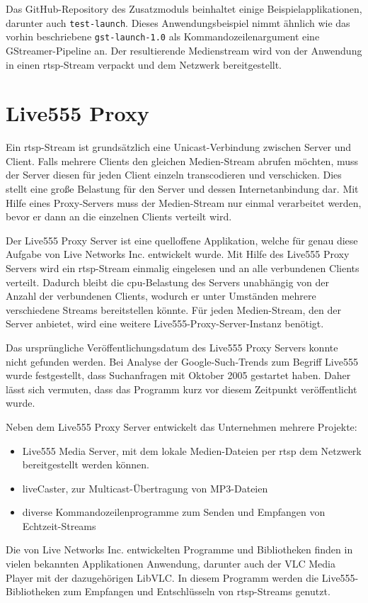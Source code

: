 Das GitHub-Repository des Zusatzmoduls beinhaltet einige Beispielapplikationen, darunter auch \texttt{test-launch}.
Dieses Anwendungsbeispiel nimmt ähnlich wie das vorhin beschriebene \texttt{gst-launch-1.0} als Kommandozeilenargument eine GStreamer-Pipeline an.
Der resultierende Medienstream wird von der Anwendung in einen \ac{rtsp}-Stream verpackt und dem Netzwerk bereitgestellt.

\section{Live555 Proxy}
Ein \ac{rtsp}-Stream ist grundsätzlich eine Unicast-Verbindung zwischen Server und Client.
Falls mehrere Clients den gleichen Medien-Stream abrufen möchten, muss der Server diesen für jeden Client einzeln transcodieren und verschicken.
Dies stellt eine große Belastung für den Server und dessen Internetanbindung dar.
Mit Hilfe eines Proxy-Servers muss der Medien-Stream nur einmal verarbeitet werden, bevor er dann an die einzelnen Clients verteilt wird.\par

Der Live555 Proxy Server ist eine quelloffene Applikation, welche für genau diese Aufgabe von Live Networks Inc. entwickelt wurde.
Mit Hilfe des Live555 Proxy Servers wird ein \ac{rtsp}-Stream einmalig eingelesen und an alle verbundenen Clients verteilt.
Dadurch bleibt die \ac{cpu}-Belastung des Servers unabhängig von der Anzahl der verbundenen Clients, wodurch er unter Umständen mehrere verschiedene Streams bereitstellen könnte. Für jeden Medien-Stream, den der Server anbietet, wird eine weitere Live555-Proxy-Server-Instanz benötigt.\par

Das ursprüngliche Veröffentlichungsdatum des Live555 Proxy Servers konnte nicht gefunden werden.
Bei Analyse der Google-Such-Trends zum Begriff Live555 wurde festgestellt, dass Suchanfragen mit Oktober 2005 gestartet haben.
Daher lässt sich vermuten, dass das Programm kurz vor diesem Zeitpunkt veröffentlicht wurde. \cite[vgl.][Interest over time]{live555-trends}

Neben dem Live555 Proxy Server entwickelt das Unternehmen mehrere Projekte:
\begin{itemize}
    \item Live555 Media Server, mit dem lokale Medien-Dateien per \ac{rtsp} dem Netzwerk bereitgestellt werden können.
    \item liveCaster, zur Multicast-Übertragung von MP3-Dateien
    \item diverse Kommandozeilenprogramme zum Senden und Empfangen von Echtzeit-Streams
\end{itemize}
Die von Live Networks Inc. entwickelten Programme und Bibliotheken finden in vielen bekannten Applikationen Anwendung, darunter auch der VLC Media Player mit der dazugehörigen LibVLC. In diesem Programm werden die Live555-Bibliotheken zum Empfangen und Entschlüsseln von \ac{rtsp}-Streams genutzt.